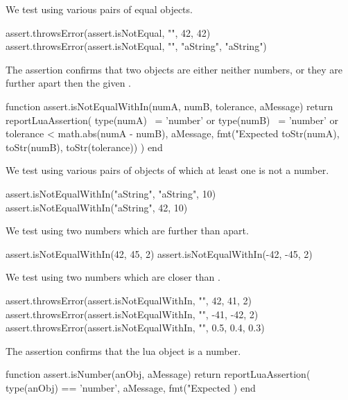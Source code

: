 We test using various pairs of equal objects.

\startLuaTest
  assert.throwsError(assert.isNotEqual, "", 42, 42)
  assert.throwsError(assert.isNotEqual, "", "aString", "aString")
\stopLuaTest
\stopTestCase

\stopTestSuite


The  assertion confirms that two objects are 
either neither numbers, or they are further apart then the given 
. 

\startLuaCode
function assert.isNotEqualWithIn(numA, numB, tolerance, aMessage)
  return reportLuaAssertion(
    type(numA) ~= 'number' or type(numB) ~= 'number'
    or tolerance < math.abs(numA - numB), 
    aMessage,
    fmt("Expected %
      toStr(numA), toStr(numB), toStr(tolerance))
  )
end
\stopLuaCode


We test using various pairs of objects of which at least one is not a 
number. 

\startLuaTest
  assert.isNotEqualWithIn("aString", "aString", 10)
  assert.isNotEqualWithIn("aString", 42, 10)
\stopLuaTest
\stopTestCase


We test using two numbers which are further than  apart. 

\startLuaTest
  assert.isNotEqualWithIn(42, 45, 2)
  assert.isNotEqualWithIn(-42, -45, 2)
\stopLuaTest
\stopTestCase


We test using two numbers which are closer than . 

\startLuaTest
  assert.throwsError(assert.isNotEqualWithIn, "", 42, 41, 2)
  assert.throwsError(assert.isNotEqualWithIn, "", -41, -42, 2)
  assert.throwsError(assert.isNotEqualWithIn, "", 0.5, 0.4, 0.3)
\stopLuaTest
\stopTestSuite


The  assertion confirms that the lua object is a 
number. 

\startLuaCode
function assert.isNumber(anObj, aMessage)
  return reportLuaAssertion(
    type(anObj) == 'number',
    aMessage,
    fmt("Expected %
  )
end
\stopLuaCode

